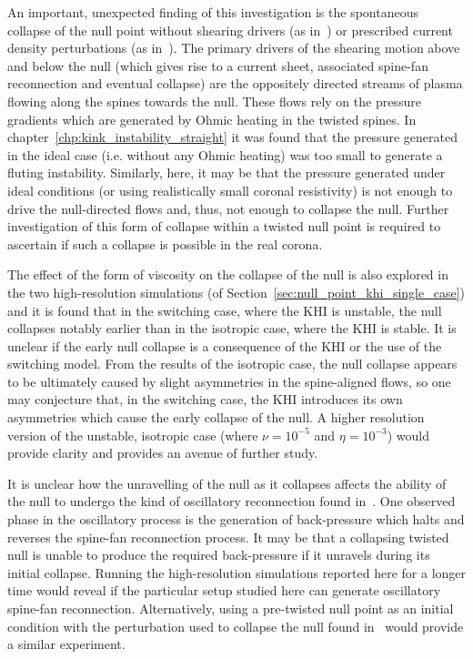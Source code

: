 An important, unexpected finding of this investigation is the spontaneous collapse of the null point without shearing drivers (as in~\cite{pontinCurrentSheetFormation2007}) or prescribed current density perturbations (as in~\cite{thurgoodImplosiveCollapseMagnetic2018}). The primary drivers of the shearing motion above and below the null (which gives rise to a current sheet, associated spine-fan reconnection and eventual collapse) are the oppositely directed streams of plasma flowing along the spines towards the null. These flows rely on the pressure gradients which are generated by Ohmic heating in the twisted spines. In chapter~\ref{chp:kink_instability_straight} it was found that the pressure generated in the ideal case (i.e. without any Ohmic heating) was too small to generate a fluting instability. Similarly, here, it may be that the pressure generated under ideal conditions (or using realistically small coronal resistivity) is not enough to drive the null-directed flows and, thus, not enough to collapse the null. Further investigation of this form of collapse within a twisted null point is required to ascertain if such a collapse is possible in the real corona.

The effect of the form of viscosity on the collapse of the null is also explored in the two high-resolution simulations (of Section~\ref{sec:null_point_khi_single_case}) and it is found that in the switching case, where the KHI is unstable, the null collapses notably earlier than in the isotropic case, where the KHI is stable. It is unclear if the early null collapse is a consequence of the KHI or the use of the switching model. From the results of the isotropic case, the null collapse appears to be ultimately caused by slight asymmetries in the spine-aligned flows, so one may conjecture that, in the switching case, the KHI introduces its own asymmetries which cause the early collapse of the null. A higher resolution version of the unstable, isotropic case (where $\nu = 10^{-5}$ and $\eta=10^{-3}$) would provide clarity and provides an avenue of further study.

It is unclear how the unravelling of the null as it collapses affects the ability of the null to undergo the kind of oscillatory reconnection found in~\cite{thurgoodThreedimensionalOscillatoryMagnetic2017}. One observed phase in the oscillatory process is the generation of back-pressure which halts and reverses the spine-fan reconnection process. It may be that a collapsing twisted null is unable to produce the required back-pressure if it unravels during its initial collapse. Running the high-resolution simulations reported here for a longer time would reveal if the particular setup studied here can generate oscillatory spine-fan reconnection. Alternatively, using a pre-twisted null point as an initial condition with the perturbation used to collapse the null found in~\cite{thurgoodThreedimensionalOscillatoryMagnetic2017} would provide a similar experiment.


